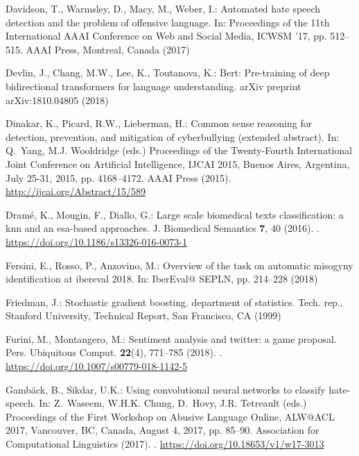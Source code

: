 \documentclass{article}
\begin{document}
\begin{thebibliography}{10}
Davidson, T., Warmsley, D., Macy, M., Weber, I.: Automated hate speech
  detection and the problem of offensive language.
\newblock In: Proceedings of the 11th International AAAI Conference on Web and
  Social Media, ICWSM '17, pp. 512--515. {AAAI} Press, Montreal, Canada (2017)

Devlin, J., Chang, M.W., Lee, K., Toutanova, K.: Bert: Pre-training of deep
  bidirectional transformers for language understanding.
\newblock arXiv preprint arXiv:1810.04805  (2018)

Dinakar, K., Picard, R.W., Lieberman, H.: Common sense reasoning for detection,
  prevention, and mitigation of cyberbullying (extended abstract).
\newblock In: Q.~Yang, M.J. Wooldridge (eds.) Proceedings of the Twenty-Fourth
  International Joint Conference on Artificial Intelligence, {IJCAI} 2015,
  Buenos Aires, Argentina, July 25-31, 2015, pp. 4168--4172. {AAAI} Press
  (2015).
\newblock \urlprefix\url{http://ijcai.org/Abstract/15/589}

Dram{\'{e}}, K., Mougin, F., Diallo, G.: Large scale biomedical texts
  classification: a knn and an esa-based approaches.
\newblock J. Biomedical Semantics \textbf{7}, 40 (2016).
\newblock {}.
\newblock \urlprefix\url{https://doi.org/10.1186/s13326-016-0073-1}

Fersini, E., Rosso, P., Anzovino, M.: Overview of the task on automatic
  misogyny identification at ibereval 2018.
\newblock In: IberEval@ SEPLN, pp. 214--228 (2018)

Friedman, J.: Stochastic gradient boosting. department of statistics.
\newblock Tech. rep., Stanford University, Technical Report, San Francisco, CA
  (1999)

Furini, M., Montangero, M.: Sentiment analysis and twitter: a game proposal.
\newblock Pers. Ubiquitous Comput. \textbf{22}(4), 771--785 (2018).
\newblock {}.
\newblock \urlprefix\url{https://doi.org/10.1007/s00779-018-1142-5}

Gamb{\"{a}}ck, B., Sikdar, U.K.: Using convolutional neural networks to
  classify hate-speech.
\newblock In: Z.~Waseem, W.H.K. Chung, D.~Hovy, J.R. Tetreault (eds.)
  Proceedings of the First Workshop on Abusive Language Online, ALW@ACL 2017,
  Vancouver, BC, Canada, August 4, 2017, pp. 85--90. Association for
  Computational Linguistics (2017).
\newblock {}.
\newblock \urlprefix\url{https://doi.org/10.18653/v1/w17-3013}


\end{thebibliography}
\end{document}
